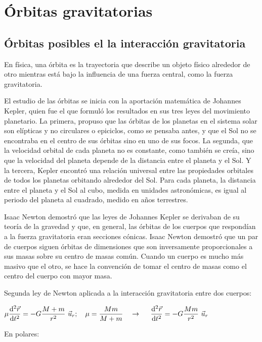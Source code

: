 \chapter{Órbitas gravitatorias}

\section{Órbitas posibles el la interacción gravitatoria}
\begin{miparrafo}
	En física, una órbita es la trayectoria que describe un objeto físico alrededor de otro mientras está bajo la influencia de una fuerza central, como la fuerza gravitatoria.

El estudio de las órbitas se inicia con la aportación matemática de Johannes Kepler, quien fue el que formuló los resultados en sus tres leyes del movimiento planetario. La primera, propuso que las órbitas de los planetas en el sistema solar son elípticas y no circulares o epiciclos, como se pensaba antes, y que el Sol no se encontraba en el centro de sus órbitas sino en uno de sus focos. La segunda, que la velocidad orbital de cada planeta no es constante, como también se creía, sino que la velocidad del planeta depende de la distancia entre el planeta y el Sol. Y la tercera, Kepler encontró una relación universal entre las propiedades orbitales de todos los planetas orbitando alrededor del Sol. Para cada planeta, la distancia entre el planeta y el Sol al cubo, medida en unidades astronómicas, es igual al periodo del planeta al cuadrado, medido en años terrestres.

Isaac Newton demostró que las leyes de Johannes Kepler se derivaban de su teoría de la gravedad y que, en general, las órbitas de los cuerpos que respondían a la fuerza gravitatoria eran secciones cónicas. Isaac Newton demostró que un par de cuerpos siguen órbitas de dimensiones que son inversamente proporcionales a sus masas sobre su centro de masas común. Cuando un cuerpo es mucho más masivo que el otro, se hace la convención de tomar el centro de masas como el centro del cuerpo con mayor masa.
\end{miparrafo}

Segunda ley de Newton aplicada a la interacción gravitatoria entre dos cuerpos:

$\displaystyle \mu \dv[2]{\vec r}{t}=-G \dfrac{M+m}{r^2} \ \vec u_r ;\quad \mu=\dfrac{Mm}{M+m} \quad \to \ \quad \dv[2]{\vec r}{t}=-G \dfrac{Mm}{r^2} \ \vec u_r$

En polares: 

